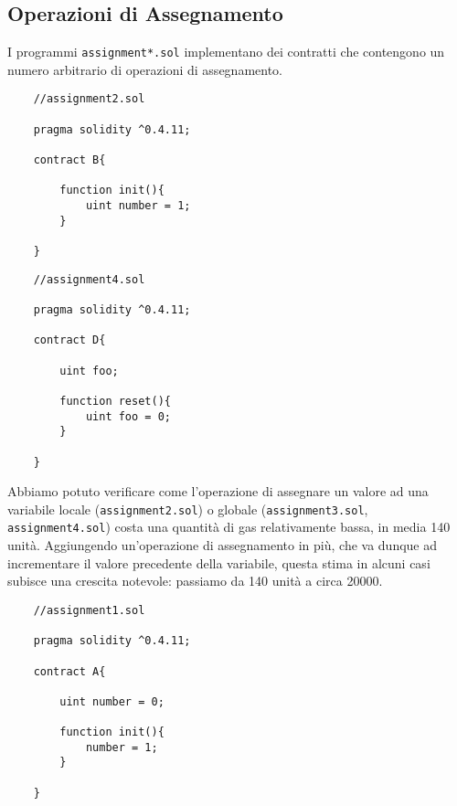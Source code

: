     \subsection{Operazioni di Assegnamento}
    
    I programmi \verb|assignment*.sol| implementano dei contratti che contengono un numero arbitrario di operazioni di assegnamento.
    
    
    \noindent
    \begin{minipage}[t]{.5\linewidth}
    \begin{lstlisting}
    //assignment2.sol
        
    pragma solidity ^0.4.11;

    contract B{

        function init(){
            uint number = 1;    
        }

    }

    \end{lstlisting}
    \end{minipage}
    \begin{minipage}[t]{.5\linewidth}
    \begin{lstlisting}
    //assignment4.sol

    pragma solidity ^0.4.11;

    contract D{

        uint foo;

        function reset(){
            uint foo = 0;    
        }

    }
    \end{lstlisting}
    \end{minipage}

    Abbiamo potuto verificare come l'operazione di assegnare un valore ad una variabile locale (\verb|assignment2.sol|) o globale (\verb|assignment3.sol|, \verb|assignment4.sol|) costa una quantità di gas relativamente bassa, in media 140 unità.
    Aggiungendo un'operazione di assegnamento in più, che va dunque ad incrementare il valore precedente della variabile, questa stima in alcuni casi subisce una crescita notevole: passiamo da 140 unità a circa 20000.
    
    \begin{center}
    \begin{minipage}{\linewidth}
    \begin{lstlisting}
    //assignment1.sol
        
    pragma solidity ^0.4.11;

    contract A{

        uint number = 0;

        function init(){
            number = 1;    
        }

    }
    \end{lstlisting} 
    \end{minipage}
    \end{center}

